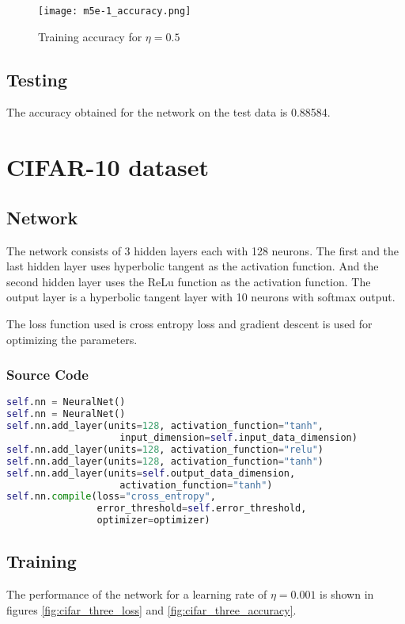 \documentclass{article}
\begin{document}
\begin{figure}[!ht]
  \texttt{[image: m5e-1\_accuracy.png]}
  \caption{Training accuracy for $\eta = 0.5$}
  \label{fig:mnist_one_accuracy}
\end{figure}

\subsection{Testing}
The accuracy obtained for the network on the test data is 0.88584.

\section {CIFAR-10 dataset}
\subsection{Network}
The network consists of 3 hidden layers each with 128 neurons.  The first and the last
hidden layer uses hyperbolic tangent as the activation function. And the second
hidden layer uses the ReLu function as the activation function. The output layer is
a hyperbolic tangent layer with 10 neurons with softmax output.

The loss function used is cross entropy loss and gradient descent is used for
optimizing the parameters.

\subsubsection{Source Code}
\begin{lstlisting}[language=python]
self.nn = NeuralNet()
self.nn = NeuralNet()
self.nn.add_layer(units=128, activation_function="tanh",
                    input_dimension=self.input_data_dimension)
self.nn.add_layer(units=128, activation_function="relu")
self.nn.add_layer(units=128, activation_function="tanh")
self.nn.add_layer(units=self.output_data_dimension,
                    activation_function="tanh")
self.nn.compile(loss="cross_entropy",
                error_threshold=self.error_threshold,
                optimizer=optimizer)
\end{lstlisting}

\subsection{Training}
The performance of the network for a learning rate of $\eta = 0.001$ is shown in figures
\ref{fig:cifar_three_loss} and \ref{fig:cifar_three_accuracy}.
\end{document}
